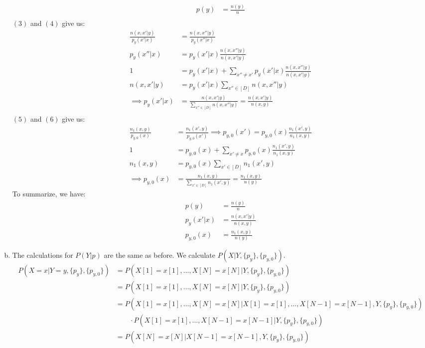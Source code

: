 \documentclass{amsart}
\theoremstyle{definition}
\begin{document}
\begin{enumerate}[(a)]
		\begin{align*}
			p(y) &= \frac{n(y)}{n}\\
		\end{align*}
		$(3)$ and $(4)$ give us:
		\begin{align*}
			\frac{n(x, x'|y)}{p_y(x'|x)} &= \frac{n(x, x''|y)}{p_y(x''|x)}\\
			p_y(x''|x) &= p_y(x'|x)\frac{n(x, x''|y)}{n(x, x'|y)}\\
			1 &= p_y(x'|x) + \sum_{x'' \neq x'}p_y(x'|x)\frac{n(x, x''|y)}{n(x, x'|y)}\\
			n(x, x'|y) &= p_y(x'|x)\sum_{x'' \in [D]} n(x, x''|y)\\
			\implies p_y(x'|x) &= \frac{n(x, x'|y)}{\sum_{x'' \in [D]} n(x, x''|y)} = \frac{n(x, x'|y)}{n(x, y)}\\
		\end{align*}
		$(5)$ and $(6)$ give us:
		\begin{align*}
			\frac{n_1(x, y)}{p_{y, 0}(x)} &= \frac{n_1(x', y)}{p_{y, 0}(x')}\implies p_{y, 0}(x') = p_{y, 0}(x)\frac{n_1(x', y)}{n_1(x, y)}\\
			1 &= p_{y, 0}(x) + \sum_{x' \neq x}p_{y, 0}(x)\frac{n_1(x', y)}{n_1(x, y)}\\
			n_1(x, y) &= p_{y, 0}(x)\sum_{x' \in [D]} n_1(x', y)\\
			\implies p_{y, 0}(x) &= \frac{n_1(x, y)}{\sum_{x' \in [D]} n_1(x', y)} = \frac{n_1(x,y)}{n(y)}
		\end{align*}
		To summarize, we have:
		\begin{align*}
			p(y) &= \frac{n(y)}{n}\\
			p_y(x'|x) &= \frac{n(x, x'|y)}{n(x, y)}\\
			p_{y, 0}(x) &= \frac{n_1(x, y)}{n(y)}
		\end{align*}
	\item 
		The calculations for $P(Y|p)$ are the same as before. We calculate $P(X|Y, \{p_y\}, \{p_{y, 0}\})$.
		\begin{align*}
			P(X = x|Y = y, \{p_y\}, \{p_{y, 0}\}) &= P(X[1] = x[1], \ldots, X[N] = x[N]|Y, \{p_y\}, \{p_{y, 0}\})\\
			&= P(X[1] = x[1], \ldots, X[N] = x[N]| Y, \{p_y\}, \{p_{y, 0}\})\\
			&= P(X[1] = x[1], \ldots , X[N] = x[N]| X[1] = x[1], \ldots, X[N-1] = x[N-1], Y, \{p_y\}, \{p_{y, 0}\})\\
			&\qquad\cdot P(X[1] = x[1], \ldots, X[N-1] = x[N-1]| Y, \{p_y\}, \{p_{y, 0}\})\\
			&= P(X[N] = x[N]|X[N-1] = x[N-1], Y, \{p_y\}, \{p_{y, 0}\})\\

\end{align*}
\end{enumerate}
\end{document}
